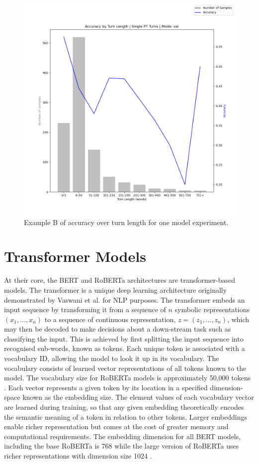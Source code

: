 \documentclass[12pt]{report}
\begin{document}
\begin{figure}
    \includegraphics[width=\textwidth]{figures/accuracy_by_length_2024.03.14_09.59.35_model_11_val.png}
    \caption{Example B of accuracy over turn length for one model experiment.}
    \label{fig: acc over turn len 11}
\end{figure}

\chapter{Transformer Models}
\label{App: transformers}
At their core, the BERT and RoBERTa architectures are transformer-based models.
The transformer is a unique deep learning architecture originally demonstrated by Vaswani et al. \citeyear{Vaswani2017} for NLP purposes.
The transformer embeds an input sequence by transforming it from a sequence of $n$ symbolic representations $(x_1, \ldots, x_n)$ to a sequence of continuous representation, $z = (z_1, \ldots, z_n)$, which may then be decoded to make decisions about a down-stream task such as classifying the input.
This is achieved by first splitting the input sequence into recognised sub-words, known as tokens.
Each unique token is associated with a vocabulary ID, allowing the model to look it up in its vocabulary.
The vocabulary consists of learned vector representations of all tokens known to the model.
The vocabulary size for RoBERTa models is approximately 50,000 tokens \cite{roberta}.
Each vector represents a given token by its location in a specified dimension-space known as the embedding size.
The element values of each vocabulary vector are learned during training, so that any given embedding theoretically encodes the semantic meaning of a token in relation to other tokens.
Larger embeddings enable richer representation but comes at the cost of greater memory and computational requirements.
The embedding dimension for all BERT models, including the base RoBERTa is 768 while the large version of RoBERTa uses richer representations with dimension size 1024 \cite{BERT,roberta}.
\end{document}
